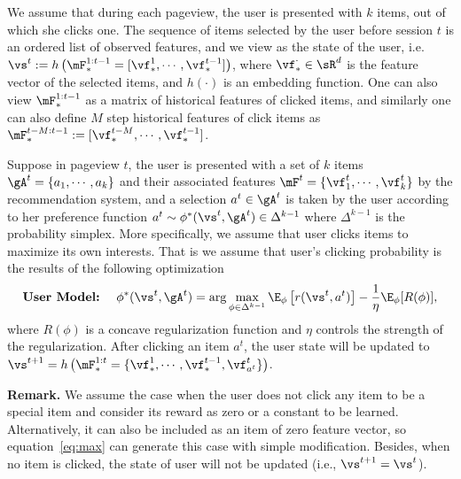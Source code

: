 \documentclass{article} %
\newcommand{\Le}[1]{{\color{red}{\bf\sf [ #1]}}}
\newcommand{\shuang}[1]{{\color{purple}{\bf\sf[ #1]}}}
\newcommand{\Li}[1]{{\color{cyan}{\bf\sf [Li: #1]}}}
\begin{document}
We assume that during each pageview, the user is presented with $k$ items, out of which she clicks one. The sequence of items selected by the user before session $t$ is an ordered list of observed features, and we view \Li{\st{it or embedding of it} its embedding} as the state of the user, i.e. $\vs^t := h\left(\mF_\ast^{1:t-1} = [ \vf_\ast^{1},\cdots,\vf_\ast^{t-1} ]\right)$, where $\vf_\ast^\cdot \in \sR^d$ is the feature vector of the selected items, and $h(\cdot)$ is an embedding function. One can also view $\mF^{1:t-1}_\ast$ as a matrix of historical features of clicked items, and similarly one can also define $M$ step historical features of click items as $\mF^{t-M:t-1}_\ast:=[\vf_\ast^{t-M},\cdots,\vf_\ast^{t-1}]$.

Suppose in pageview $t$, the user is presented with a set of $k$ items $\gA^t = \{a_1, \cdots, a_k \}$ and their associated features $\mF^t = \{\vf^t_1,\cdots, \vf^t_k\}$ by the recommendation system, and a selection $a^t\in \gA^t$ is taken by the user according to her preference function $a^t\sim \phi^*(\vs^t, \gA^t)\in \Delta^{k-1}$ where $\Delta^{k-1}$ is the probability simplex. More specifically, we assume that user clicks items to maximize its own interests. That is we assume that user's clicking probability is the results of the following optimization
{\small \begin{equation}\label{eq:max}
    \textbf{User Model:}~~~~\phi^*(\vs^t,\gA^t) = \arg\max_{\phi \in \Delta^{k-1}} \E_{\phi} \left[r(\vs^t, a^t) \right] -\frac{1}{\eta}\E_{\phi}[R(\phi)],
\end{equation}}
where $R(\phi)$ is a concave regularization function and $\eta$ controls the strength of the regularization. After clicking an item $a^t$, the user state will be updated to $\vs^{t+1} =h\left(\mF_\ast^{1:t}=\{\vf_\ast^{1},\cdots,\vf_\ast^{t-1}, \vf^t_{a^t}\}\right)$.

{\bf Remark.} We assume the case when the user does not click any item to be a special item and consider its reward as zero or a constant to be learned. Alternatively, it can also be included as an item of zero feature vector, so equation~\eqref{eq:max} can generate this case with simple modification. Besides, when no item is clicked, the state of user will not be updated (i.e., $\vs^{t+1} = \vs^t$).


\end{document}
